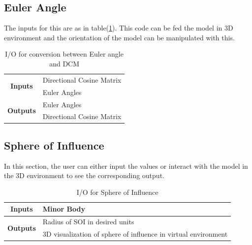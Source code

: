 \documentclass[12pt]{article}
\begin{document}
\subsection{Euler Angle}

The inputs for this are as in table(\ref{eadcm}). This code can be fed the model in 3D environment and the orientation of the model can be manipulated with this.
\begin{table}[H]
\centering
\begin{tabular}{@{}cl@{}}
\toprule
\multirow{2}{*}{\textbf{Inputs}}                      & Directional Cosine Matrix \\ \cmidrule(l){2-2} 
                                             & Euler Angles              \\ \midrule
\multicolumn{1}{r}{\multirow{2}{*}{\textbf{Outputs}}} & Euler Angles              \\ \cmidrule(l){2-2} 
\multicolumn{1}{r}{}                         & Directional Cosine Matrix \\ \bottomrule
\end{tabular}
\caption{I/O for conversion between Euler angle and DCM}
\label{eadcm}
\end{table}
\subsection{Sphere of Influence}
In this section, the user can either input the values or interact with the model in the 3D environment to see the corresponding output.
\begin{table}[H]
\centering
\begin{tabular}{@{}rl@{}}
\toprule
\multicolumn{1}{c}{\textbf{Inputs}} & Minor Body                     \\ \midrule
\multirow{2}{*}{\textbf{Outputs}}   & Radius of SOI in desired units \\ \cmidrule(l){2-2} 
                           & 3D visualization of sphere of influence in virtual environment                         \\ \bottomrule
\end{tabular}
\caption{I/O for Sphere of Influence}
\label{soi}
\end{table}
\end{document}
